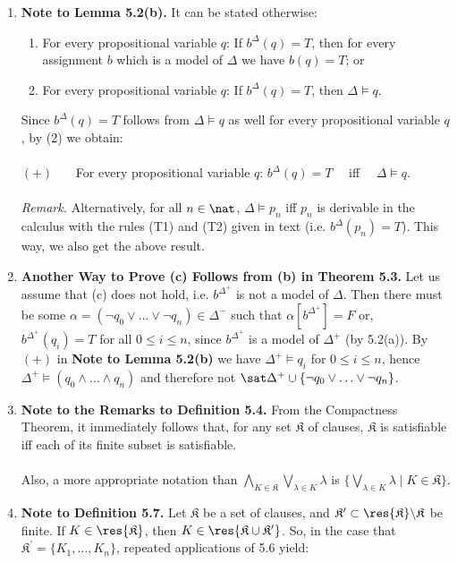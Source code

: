 \begin{enumerate}[1.]
\item \textbf{Note to Lemma 5.2(b).} It can be stated otherwise:
\begin{enumerate}[(1)]
\item For every propositional variable $q$: If $b^\Delta (q) = T$, then for every assignment $b$ which is a model of $\Delta$ we have $b (q) = T$; or
\item For every propositional variable $q$: If $b^\Delta (q) = T$, then $\Delta \models q$.
\end{enumerate}
Since $b^\Delta (q) = T$ follows from $\Delta \models q$ as well for every propositional variable $q$, by (2) we obtain:\\
\ \\
$(+)$ \ \ \ For every propositional variable $q$: $b^\Delta (q) = T$ \ \ iff \ \ $\Delta \models q$. \ \ \ \phantom{$(+)$}\\
\ \\
\textit{Remark.} Alternatively, for all $n \in \nat$, $\Delta \models p_n$ iff $p_n$ is derivable in the calculus with the rules (T1) and (T2) given in text (i.e. $b^\Delta (p_n) = T$). This way, we also get the above result.
%
\item \textbf{Another Way to Prove (c) Follows from (b) in Theorem 5.3.} Let us assume that (c) does not hold, i.e. $b^{\Delta^+}$ is not a model of $\Delta$. Then there must be some $\alpha = (\neg q_0 \lor \ldots \lor \neg q_n) \in \Delta^-$ such that $\alpha [b^{\Delta^+}] = F$ or, $b^{\Delta^+}(q_i) = T$ for all $0 \leq i \leq n$, since $b^{\Delta^+}$ is a model of $\Delta^+$ (by 5.2(a)). By $(+)$ in \textbf{Note to Lemma 5.2(b)} we have $\Delta^+ \models q_i$ for $0 \leq i \leq n$, hence $\Delta^+ \models (q_0 \land \ldots \land q_n)$ and therefore not $\sat \Delta^+ \cup \{ \neg q_0 \lor \ldots \lor \neg q_n \}$.
%
\item \textbf{Note to the Remarks to Definition 5.4.} From the Compactness Theorem, it immediately follows that, for any set $\mathfrak{K}$ of clauses, $\mathfrak{K}$ is satisfiable iff each of its finite subset is satisfiable.\\
\ \\
Also, a more appropriate notation than $\bigwedge_{K \in \mathfrak{K}} \bigvee_{\lambda \in K} \lambda$ is $\{ \bigvee_{\lambda \in K} \lambda \mid K \in \mathfrak{K} \}$.
%
\item \textbf{Note to Definition 5.7.} Let $\mathfrak{K}$ be a set of clauses, and $\mathfrak{K}^\prime \subset \res{\mathfrak{K}} \backslash \mathfrak{K}$ be finite. If $K \in \res{\mathfrak{K}}$, then $K \in \res{\mathfrak{K} \cup \mathfrak{K}^\prime}$. So, in the case that $\mathfrak{K}^\prime = \{ K_1, \ldots, K_n \}$, repeated applications of 5.6 yield:

\end{enumerate}
